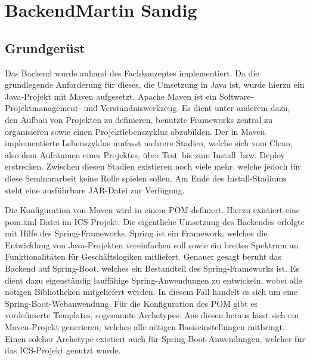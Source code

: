 	\section[Backend]{Backend{\hfill \normalsize Martin Sandig}}
\subsection{Grundgerüst}\label{umsetzung:backend:grundgeruest}
	Das Backend wurde anhand des Fachkonzeptes implementiert. Da die grundlegende Anforderung für dieses, die Umsetzung in Java ist, wurde hierzu ein Java-Projekt mit Maven aufgesetzt. Apache Maven ist ein Software-Projektmanagement- und Verständniswerkzeug.\autocite{ApacheSoftwareFoundation} Es dient unter anderem dazu, den Aufbau von Projekten zu definieren, benutzte Frameworks zentral zu organisieren sowie einen Projektlebenszyklus abzubilden. Der in Maven implementierte Lebenszyklus umfasst mehrere Stadien, welche sich vom \glqq Clean\grqq, also dem Aufräumen eines Projektes, über \glqq Test\grqq \, bis zum \glqq Install\grqq \, bzw. \glqq Deploy\grqq \, erstrecken. Zwischen diesen Stadien existieren noch viele mehr, welche jedoch für diese Seminararbeit keine Rolle spielen sollen. Am Ende des \glqq Install\grqq -Stadiums steht eine ausführbare JAR-Datei zur Verfügung.

	Die Konfiguration von Maven wird in einem \ac{POM} definiert. Hierzu existiert eine \glqq pom.xml\grqq-Datei im \ac{ICS}-Projekt. Die eigentliche Umsetzung des Backendes erfolgte mit Hilfe des \glqq Spring\grqq -Frameworks. Spring ist ein Framework, welches die Entwicklung von Java-Projekten vereinfachen soll sowie ein breites Spektrum an Funktionalitäten für Geschäftslogiken mitliefert.  Genauer gesagt beruht das Backend auf \glqq Spring-Boot\grqq, welches ein Bestandteil des Spring-Frameworks ist. Es dient dazu eigenständig lauffähige Spring-Anwendungen zu entwickeln, wobei alle nötigen Bibliotheken mitgeliefert werden.\autocite{PivotalSoftwareInc} In diesem Fall handelt es sich um eine Spring-Boot-Webanwendung. Für die Konfiguration des \ac{POM} gibt es vordefinierte Templates, sogenannte \glqq Archetypes\grqq. Aus diesen heraus lässt sich ein Maven-Projekt generieren, welches alle nötigen Basiseinstellungen mitbringt. Einen solcher Archetype existiert auch für Spring-Boot-Anwendungen, welcher für das \ac{ICS}-Projekt genutzt wurde.

